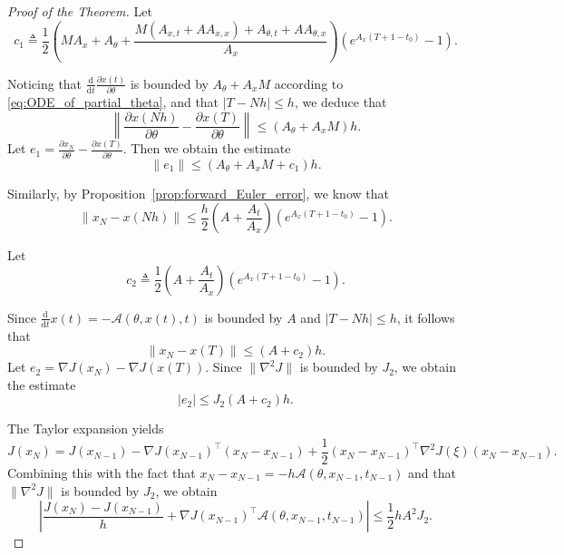 \documentclass{article}
\newcommand{\dd}{\mathrm{d}}
\begin{document}
\begin{proof}[Proof of the Theorem]
    Let \begin{equation}\label{eq:def_c1}
        c_1 \triangleq\frac{1}{2}
        \left(
        MA_x+A_{\theta}+
        \frac{M(A_{x,t}+AA_{x,x})+A_{\theta,t}+AA_{\theta,x}}{A_x}
        \right)
        \left(e^{A_x(T+1-t_0)} - 1\right).
    \end{equation}

    Noticing that $\frac{\dd}{\dd t}\frac{\partial x(t)}{\partial \theta}$ is bounded by $A_{\theta}+A_xM$ according to \eqref{eq:ODE_of_partial_theta}, and that $|T - Nh| \leq h$, we deduce that
    \[
        \left\|\frac{\partial x(Nh)}{\partial \theta} - \frac{\partial x(T)}{\partial \theta}\right\| \leq (A_{\theta}+A_xM) h.
    \]
    Let $e_1 = \frac{\partial x_N}{\partial \theta} - \frac{\partial x(T)}{\partial \theta}$. Then we obtain the estimate
    \begin{equation}\label{eq:err_of_e1}
        \|e_1\| \leq (A_{\theta}+A_xM + c_1)h.
    \end{equation}

    Similarly, by Proposition~\ref{prop:forward_Euler_error}, we know that
    \[
        \|x_N - x(Nh)\| \leq \frac{h}{2} \left(A + \frac{A_t}{A_x} \right) \left(e^{A_x(T+1-t_0)} - 1\right).
    \]

    Let
    \begin{equation}\label{eq:def_c2}
        c_2\triangleq \frac{1}{2} \left(A + \frac{A_t}{A_x} \right) \left(e^{A_x(T+1-t_0)} - 1\right).
    \end{equation}

    Since $\frac{\dd}{\dd t}x(t) = -\mathcal{A}(\theta,x(t),t)$ is bounded by $A$ and $|T - Nh| \leq h$, it follows that
    \[
        \|x_N - x(T)\| \leq (A + c_2)h.
    \]
    Let $e_2 = \nabla J(x_N) - \nabla J(x(T))$. Since $\|\nabla^2 J\|$ is bounded by $J_2$, we obtain the estimate
    \begin{equation}\label{eq:err_of_e2}
        |e_2| \leq J_2 (A + c_2) h.
    \end{equation}

    The Taylor expansion yields
    \[
        J(x_N) = J(x_{N-1}) - \nabla J(x_{N-1})^\top(x_N - x_{N-1}) + \frac{1}{2}(x_N - x_{N-1})^\top \nabla^2 J(\xi)(x_N - x_{N-1}).
    \]
    Combining this with the fact that $x_N - x_{N-1} = -h \mathcal{A}(\theta,x_{N-1},t_{N-1})$ and that  $\|\nabla^2 J\|$ is bounded by $J_2$, we obtain
    \[
        \left| \frac{J(x_N) - J(x_{N-1})}{h} + \nabla J(x_{N-1})^\top \mathcal{A}(\theta,x_{N-1},t_{N-1}) \right| \leq \frac{1}{2} h A^2 J_2.
    \]


\end{proof}
\end{document}
